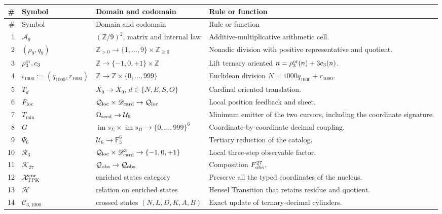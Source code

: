 \begingroup
\scriptsize
\renewcommand{\arraystretch}{1.12}
\begin{longtable}{@{}r p{}p{}p{}@{}}
\toprule
\#&Symbol&Domain and codomain&Rule or function\\
\midrule
\endfirsthead
\toprule
\#&Symbol&Domain and codomain&Rule or function\\
\midrule
\endhead
1&\(\mathcal A_9\)&\((\mathbb Z/9)^2\), matrix and internal law&
Additive-multiplicative arithmetic cell.\\
2&\((\rho_9,q_9)\)&\(\mathbb Z_{>0}\to
\{1,\ldots,9\}\times\mathbb Z_{\geq0}\)&
Nonadic division with positive representative and quotient.\\
3&\(\rho_3^{\rm or},c_3\)&\(\mathbb Z\to
\{-1,0,+1\}\times\mathbb Z\)&
Lift ternary oriented \(n=\rho_3^{\rm or}(n)+3c_3(n)\).\\
4&\(\iota_{1000}:=(q_{1000},r_{1000})\)&\(\mathbb Z\to
\mathbb Z\times\{0,\ldots,999\}\)&
Euclidean division \(N=1000q_{1000}+r_{1000}\).\\
5&\(T_d\)&\(X_9\to X_9\), \(d\in\{N,E,S,O\}\)&
Cardinal oriented translation.\\
6&\(F_{\rm loc}\)&\(\mathcal Q_{\rm loc}\times
\mathscr D_{\rm card}\to\mathcal Q_{\rm loc}\)&
Local position feedback and sheet.\\
7&\(T_{\min}\)&\(\Omega_{\rm seed}\to\mathcal U_6\)&
Minimum emitter of the two cursors, including the coordinate signature.\\
8&\(G\)&\(\operatorname{im}s_\Sigma\times
\operatorname{im}s_\Pi\to\{0,\ldots,999\}^6\)&
Coordinate-by-coordinate decimal coupling.\\
9&\(\Psi_6\)&\(\mathcal U_6\to\mathbb F_3^6\)&
Tertiary reduction of the catalog.\\
10&\(\mathcal R_3\)&\(\mathcal Q_{\rm loc}\times
\mathscr D_{\rm card}^3\to\{-1,0,+1\}\)&
Local three-step observable factor.\\
11&\(\mathcal K_{27}\)&\(\mathcal Q_{\rm obs}\to\mathcal Q_{\rm obs}\)&
Composition \(F_{\rm obs}^{27}\).\\
12&\(\mathcal X_{\rm TPK}^{\rm enr}\)&enriched states category&
Preserve all the typed coordinates of the nucleus.\\
13&\(\mathcal H\)&relation on enriched states&
Hensel Transition that retains residue and quotient.\\
14&\(\mathcal C_{3,1000}\)&crossed states
\((N,L,D,K,A,B)\)&
Exact update of ternary-decimal cylinders.\\

\end{longtable}
